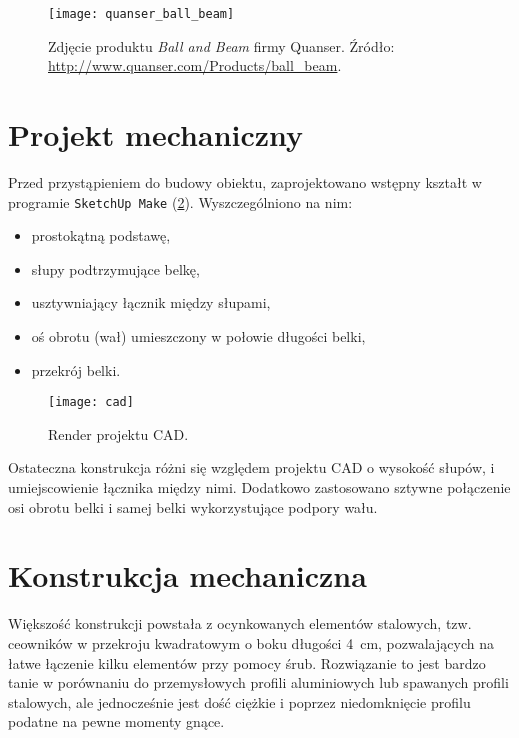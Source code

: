 \begin{figure}[H]
	\centering
	\texttt{[image: quanser\_ball\_beam]}
	\caption{Zdjęcie produktu \textit{Ball and Beam} firmy Quanser. Źródło: \url{http://www.quanser.com/Products/ball_beam}.}
	\label{fig:quanser_ball_beam}
\end{figure}

\section{Projekt mechaniczny}

Przed przystąpieniem do budowy obiektu, zaprojektowano wstępny kształt w programie  \texttt{SketchUp Make} (\cref{fig:cad_render_1}). Wyszczególniono na nim:

\begin{itemize}
	\item prostokątną podstawę,
	\item słupy podtrzymujące belkę,
	\item usztywniający łącznik między słupami,
	\item oś obrotu (wał) umieszczony w połowie długości belki,
	\item przekrój belki.
\end{itemize}

\begin{figure}[H]
	\centering
	\texttt{[image: cad]}
	\caption{Render projektu CAD.}
	\label{fig:cad_render_1}
\end{figure}

Ostateczna konstrukcja różni się względem projektu \textsc{CAD} o wysokość słupów, i umiejscowienie łącznika między nimi. Dodatkowo zastosowano sztywne połączenie osi obrotu belki i samej belki wykorzystujące podpory wału.

\section{Konstrukcja mechaniczna}
\label{sec:konstrukcja_mechaniczna}

Większość konstrukcji powstała z ocynkowanych elementów stalowych, tzw. ceowników w przekroju kwadratowym o boku długości \SI{4}{cm}, pozwalających na łatwe łączenie kilku elementów przy pomocy śrub. Rozwiązanie to jest bardzo tanie w porównaniu do przemysłowych profili aluminiowych lub spawanych profili stalowych, ale jednocześnie jest dość ciężkie i poprzez niedomknięcie profilu podatne na pewne momenty gnące.

